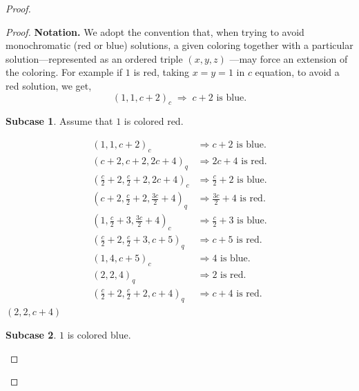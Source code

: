 \documentclass[preprint,12pt]{elsarticle}
\theoremstyle{plain}
\theoremstyle{definition}
\newtheorem{subcase}{Subcase}[case]
\begin{document}
\begin{proof}
\begin{proof}
\noindent\textbf{Notation.} We adopt the convention that, when trying to avoid monochromatic (red or blue) solutions, a given coloring together with a particular solution—represented as an ordered triple \((x,y,z)\)
—may force an extension of the coloring. For example if $1$ is red, taking $x = y =1$ in $c$ equation, to avoid a red solution, we get,
\[
(1,1,c+2)_c\;\Longrightarrow\; c+2 \text{ is blue}.
\]
\begin{subcase} Assume that $1$ is colored red. \end{subcase}
\begingroup
\setlength{\jot}{2pt} %
\begin{align*}
(1,1,c+2)_c&\Longrightarrow {c+2} \text{ is blue}.\\
(c+2,c+2,2c+4)_q&\Longrightarrow {2c+4} \text{ is red}.\\
\left(\tfrac{c}{2}+2,\tfrac{c}{2}+2,2c+4\right)_c&\Longrightarrow {\tfrac{c}{2}+2} \text{ is blue}.\\
\left(c+2,\tfrac{c}{2}+2,\tfrac{3c}{2}+4\right)_q&\Longrightarrow {\tfrac{3c}{2}+4} \text{ is red}.\\
\left(1,\tfrac{c}{2}+3,\tfrac{3c}{2}+4\right)_c&\Longrightarrow {\tfrac{c}{2}+3} \text{ is blue}.\\
\left(\tfrac{c}{2}+2,\tfrac{c}{2}+3,c+5\right)_q&\Longrightarrow {c+5} \text{ is red}.\\
(1,4,c+5)_c&\Longrightarrow {4} \text{ is blue}.\\
(2,2,4)_q&\Longrightarrow {2} \text{ is red}.\\
\left(\tfrac{c}{2}+2,\tfrac{c}{2}+2,c+4\right)_q&\Longrightarrow {c+4} \text{ is red}.
\end{align*}
$(2,2,c+4)$
\endgroup


\begin{subcase}
    $1$ is colored blue.
\end{subcase} 
\begingroup


\end{proof}
\end{proof}
\end{document}
